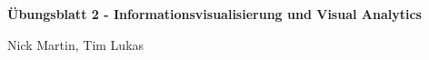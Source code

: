 \documentclass[10pt, a4paper]{article}
\begin{document}
\begin{center}
    \vspace*{1cm}
    {\Large \textbf{Übungsblatt 2 - Informationsvisualisierung und Visual Analytics}}
\end{center}
\begin{center}
    {\Large Nick Martin, Tim Lukas}
    \vspace*{1cm}
\end{center}

% 
% 
\end{document}
